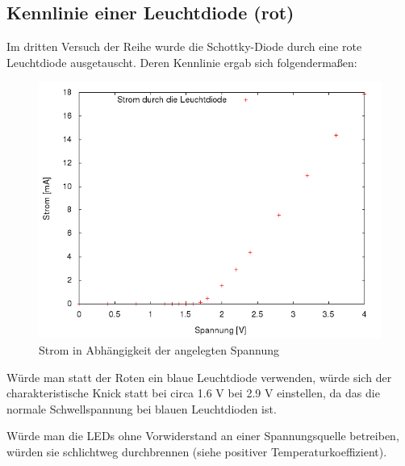 \subsection{Kennlinie einer Leuchtdiode (rot)}
Im dritten Versuch der Reihe wurde die Schottky-Diode durch eine rote Leuchtdiode ausgetauscht. Deren Kennlinie ergab sich folgendermaßen:
\begin{figure}[H]
	\centering
	\includegraphics[width=\linewidth]{versuch2/versuch_2_3.png}
	\caption{Strom in Abhängigkeit der angelegten Spannung}
\end{figure}
Würde man statt der Roten ein blaue Leuchtdiode verwenden, würde sich der charakteristische Knick statt bei circa 1.6 V bei 2.9 V einstellen, da das die normale Schwellspannung bei blauen Leuchtdioden ist.

Würde man die LEDs ohne Vorwiderstand an einer Spannungsquelle betreiben, würden sie schlichtweg durchbrennen (siehe positiver Temperaturkoeffizient).

